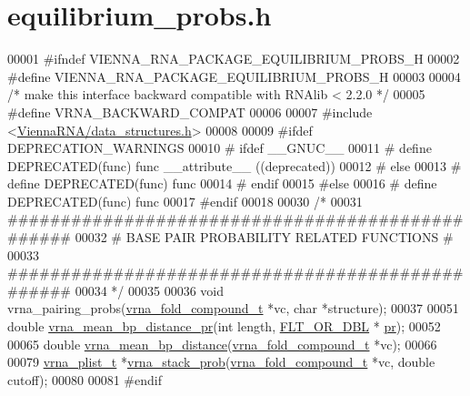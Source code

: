 \hypertarget{equilibrium__probs_8h_source}{}\section{equilibrium\+\_\+probs.\+h}
\label{equilibrium__probs_8h_source}

\begin{DoxyCode}
00001 \textcolor{preprocessor}{#ifndef VIENNA\_RNA\_PACKAGE\_EQUILIBRIUM\_PROBS\_H}
00002 \textcolor{preprocessor}{#define VIENNA\_RNA\_PACKAGE\_EQUILIBRIUM\_PROBS\_H}
00003 
00004 \textcolor{comment}{/* make this interface backward compatible with RNAlib < 2.2.0 */}
00005 \textcolor{preprocessor}{#define VRNA\_BACKWARD\_COMPAT}
00006 
00007 \textcolor{preprocessor}{#include <\hyperlink{data__structures_8h}{ViennaRNA/data\_structures.h}>}
00008 
00009 \textcolor{preprocessor}{#ifdef DEPRECATION\_WARNINGS}
00010 \textcolor{preprocessor}{# ifdef \_\_GNUC\_\_}
00011 \textcolor{preprocessor}{#  define DEPRECATED(func) func \_\_attribute\_\_ ((deprecated))}
00012 \textcolor{preprocessor}{# else}
00013 \textcolor{preprocessor}{#  define DEPRECATED(func) func}
00014 \textcolor{preprocessor}{# endif}
00015 \textcolor{preprocessor}{#else}
00016 \textcolor{preprocessor}{# define DEPRECATED(func) func}
00017 \textcolor{preprocessor}{#endif}
00018 
00030 \textcolor{comment}{/*}
00031 \textcolor{comment}{#################################################}
00032 \textcolor{comment}{# BASE PAIR PROBABILITY RELATED FUNCTIONS       #}
00033 \textcolor{comment}{#################################################}
00034 \textcolor{comment}{*/}
00035 
00036 \textcolor{keywordtype}{void}  vrna\_pairing\_probs(\hyperlink{group__fold__compound_structvrna__fc__s}{vrna\_fold\_compound\_t} *vc, \textcolor{keywordtype}{char} *structure);
00037 
00051 \textcolor{keywordtype}{double} \hyperlink{group__pf__fold_gad3f0c240512e6d43e2e4d4c2076021f5}{vrna\_mean\_bp\_distance\_pr}(\textcolor{keywordtype}{int} length, \hyperlink{group__data__structures_ga31125aeace516926bf7f251f759b6126}{FLT\_OR\_DBL} *
      \hyperlink{fold__vars_8h_ac98ec419070aee6831b44e5c700f090f}{pr});
00052 
00065 \textcolor{keywordtype}{double} \hyperlink{group__pf__fold_gaa6b8983b559b9ef4b2e1b31113ea317b}{vrna\_mean\_bp\_distance}(\hyperlink{group__fold__compound_structvrna__fc__s}{vrna\_fold\_compound\_t} *vc);
00066 
00079 \hyperlink{group__data__structures_structvrna__plist__s}{vrna\_plist\_t} *\hyperlink{group__pf__fold_ga26e3cc2eb127a35625572e9275c24ee4}{vrna\_stack\_prob}(\hyperlink{group__fold__compound_structvrna__fc__s}{vrna\_fold\_compound\_t} *vc, \textcolor{keywordtype}{
      double} cutoff);
00080 
00081 \textcolor{preprocessor}{#endif}
\end{DoxyCode}
